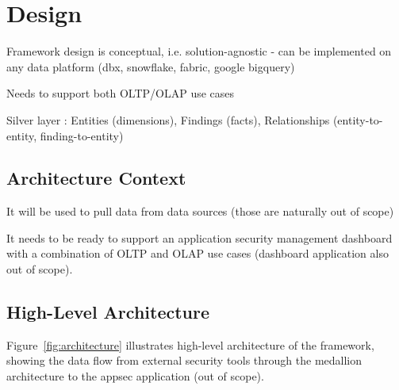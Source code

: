 \chapter{Design}
\label{ch:design}

Framework design is conceptual, i.e. solution-agnostic - can be implemented on any data platform (dbx, snowflake, fabric, google bigquery)

Needs to support both OLTP/OLAP use cases

Silver layer : Entities (dimensions), Findings (facts), Relationships (entity-to-entity, finding-to-entity)

\section{Architecture Context}

It will be used to pull data from data sources (those are naturally out of scope)

It needs to be ready to support an application security management dashboard with a combination of OLTP and OLAP use cases (dashboard application also out of scope).

\section{High-Level Architecture}

Figure~\ref{fig:architecture} illustrates high-level architecture of the framework, showing the data flow from external security tools through the medallion architecture to the appsec application (out of scope).

